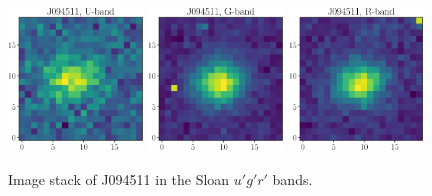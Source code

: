 \documentclass[a4paper,11pt]{article}
\begin{document}
\begin{figure}[t]
    \includegraphics[width=0.32\textwidth]{wcs_centroid_U_stack.eps}
    \includegraphics[width=0.32\textwidth]{wcs_centroid_G_stack.eps}
    \includegraphics[width=0.32\textwidth]{wcs_centroid_R_stack.eps}
    \caption{Image stack of J094511 in the Sloan $u'g'r'$ bands.}
    \label{fig:wcs_centroids}
\end{figure}
\end{document}
